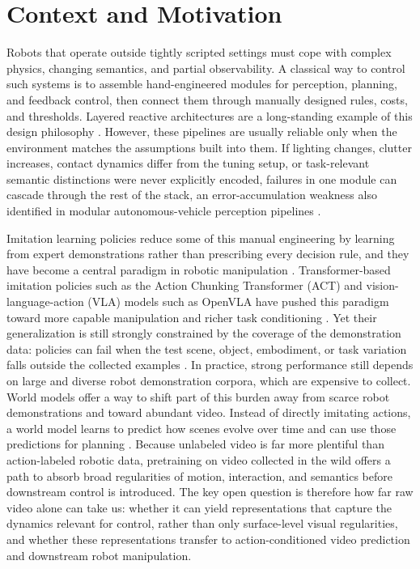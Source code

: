 \documentclass[12pt]{report}
\begin{document}
\section{Context and Motivation}
Robots that operate outside tightly scripted settings must cope with complex physics, changing semantics, and partial observability. A classical way to control such systems is to assemble hand-engineered modules for perception, planning, and feedback control, then connect them through manually designed rules, costs, and thresholds. Layered reactive architectures are a long-standing example of this design philosophy \cite{brooks1986layered}. However, these pipelines are usually reliable only when the environment matches the assumptions built into them. If lighting changes, clutter increases, contact dynamics differ from the tuning setup, or task-relevant semantic distinctions were never explicitly encoded, failures in one module can cascade through the rest of the stack, an error-accumulation weakness also identified in modular autonomous-vehicle perception pipelines \cite{stratil2025unifiedperception}.

Imitation learning policies reduce some of this manual engineering by learning from expert demonstrations rather than prescribing every decision rule, and they have become a central paradigm in robotic manipulation \cite{li2025ilmanipulation}. Transformer-based imitation policies such as the Action Chunking Transformer (ACT) and vision-language-action (VLA) models such as OpenVLA have pushed this paradigm toward more capable manipulation and richer task conditioning \cite{zhao2023act, kim2024openvla, li2025ilmanipulation}. Yet their generalization is still strongly constrained by the coverage of the demonstration data: policies can fail when the test scene, object, embodiment, or task variation falls outside the collected examples \cite{li2025ilmanipulation}. In practice, strong performance still depends on large and diverse robot demonstration corpora, which are expensive to collect. World models offer a way to shift part of this burden away from scarce robot demonstrations and toward abundant video. Instead of directly imitating actions, a world model learns to predict how scenes evolve over time and can use those predictions for planning \cite{ha2018worldmodels, hafner2019planet, hafner2023dreamerv3}. Because unlabeled video is far more plentiful than action-labeled robotic data, pretraining on video collected in the wild offers a path to absorb broad regularities of motion, interaction, and semantics before downstream control is introduced. The key open question is therefore how far raw video alone can take us: whether it can yield representations that capture the dynamics relevant for control, rather than only surface-level visual regularities, and whether these representations transfer to action-conditioned video prediction and downstream robot manipulation.
\end{document}
